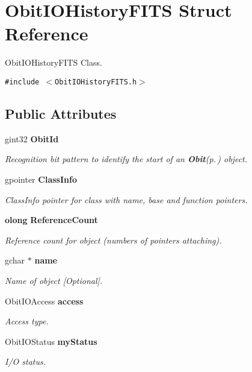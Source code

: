 \section{Obit\-IOHistory\-FITS Struct Reference}
\label{structObitIOHistoryFITS}
Obit\-IOHistory\-FITS Class.  


{\tt \#include $<$Obit\-IOHistory\-FITS.h$>$}

\subsection*{Public Attributes}
\begin{CompactItemize}
\item 
gint32 {\bf Obit\-Id}
\begin{CompactList}\small\item\em Recognition bit pattern to identify the start of an {\bf Obit}{\rm (p.\,\pageref{structObit})} object. \item\end{CompactList}\item 
gpointer {\bf Class\-Info}
\begin{CompactList}\small\item\em Class\-Info pointer for class with name, base and function pointers. \item\end{CompactList}\item 
{\bf olong} {\bf Reference\-Count}
\begin{CompactList}\small\item\em Reference count for object (numbers of pointers attaching). \item\end{CompactList}\item 
gchar $\ast$ {\bf name}
\begin{CompactList}\small\item\em Name of object [Optional]. \item\end{CompactList}\item 
Obit\-IOAccess {\bf access}
\begin{CompactList}\small\item\em Access type. \item\end{CompactList}\item 
Obit\-IOStatus {\bf my\-Status}
\begin{CompactList}\small\item\em I/O status. \item\end{CompactList}\item 

\end{CompactItemize}
